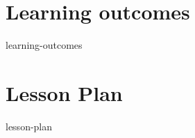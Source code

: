 \documentclass[12pt,a4paper,oneside]{book}
\begin{document}
	\tableofcontents
	\part{Learning outcomes}
		{learning-outcomes}
	\part{Lesson Plan}
		{lesson-plan}
\end{document}

